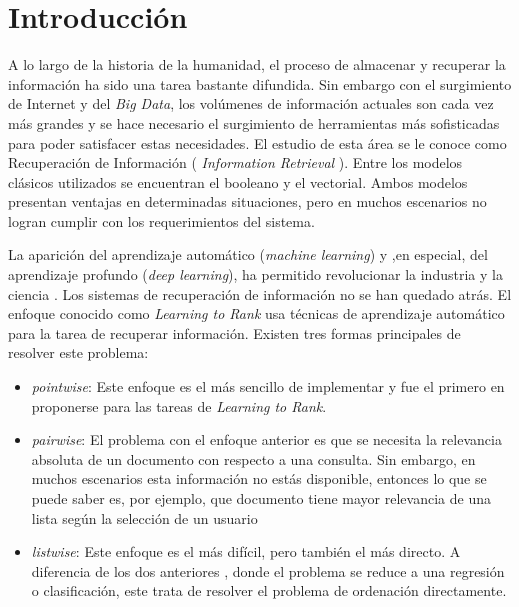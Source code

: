 \documentclass[12pt]{article}
\begin{document}
\maketitle





\section{Introducción}

A lo largo de la historia de la humanidad,  el proceso de  almacenar y recuperar la información ha sido una tarea 
bastante difundida. Sin embargo con el surgimiento de Internet y del \textit{Big Data}, los volúmenes de información 
actuales son cada vez más grandes y se hace necesario el surgimiento de herramientas más sofisticadas 
para poder satisfacer estas 
necesidades. El estudio de esta área se le conoce como Recuperación de Información ( \textit{Information Retrieval} ).
Entre los modelos clásicos utilizados se encuentran el booleano y el vectorial. Ambos modelos presentan ventajas en 
determinadas situaciones, pero en muchos escenarios no logran cumplir con los requerimientos del sistema. 

La aparición del aprendizaje automático (\textit{machine learning}) y ,en especial, del aprendizaje profundo
(\textit{deep learning}), ha permitido revolucionar la industria y la ciencia . 
Los sistemas de recuperación de información no se han quedado atrás. El enfoque conocido como \textit{Learning to Rank} 
\cite{learningtorank} usa técnicas de aprendizaje automático para la tarea de recuperar información. Existen 
tres formas principales de resolver este problema:

\begin{itemize}
	\item \textit{pointwise}: Este enfoque es el más sencillo de implementar y fue el primero en proponerse para las
		tareas de \textit{Learning to Rank}.
	\item \textit{pairwise}: El problema con el enfoque anterior es que se necesita la relevancia absoluta de un documento
		con respecto a una consulta. Sin embargo, en muchos escenarios esta información no estás disponible, entonces lo
		que se puede saber es, por ejemplo, que documento tiene mayor relevancia de una lista según la selección de un usuario 
	\item \textit{listwise}: Este enfoque es el más difícil, pero también el más directo. A diferencia de los dos anteriores
		, donde el problema se reduce a una regresión o clasificación, este trata de resolver el problema de ordenación
		directamente.
\end{itemize}
\end{document}
